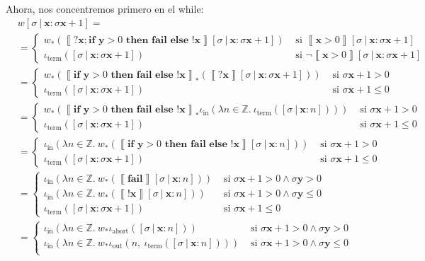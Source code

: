 \documentclass{article}
\newcommand{\sem}[1]{\left\llbracket #1\right\rrbracket}
\newcommand{\Z}{\mathbb{Z}}
\newcommand{\x}{\textbf{x}}
\newcommand{\y}{\textbf{y}}
\newcommand{\cif}[3]{\textbf{if }#1\textbf{ then }#2\textbf{ else }#3}
\newcommand{\cfail}{\textbf{fail}}
\newcommand{\iterm}[1]{\iota_\text{term}\left(#1\right)}
\newcommand{\iabort}[1]{\iota_\text{abort}\left(#1\right)}
\newcommand{\iout}[2]{\iota_\text{out}\left(#1,\ #2\right)}
\newcommand{\iin}[2]{\iota_\text{in}\left(\lambda #1 \in \Z .\ #2\right)}
\begin{document}
Ahora, nos concentremos primero en el while:
\begin{equation}
  \tag*{(8.2)}
  \begin{aligned}
    & w[\sigma\ |\ \x : \sigma\x+1] = \\ 
    &= \begin{cases}
        w_* (\sem{?\x; \cif{\y>0}{\cfail}{!\x}}[\sigma\ |\ \x : \sigma\x+1]) &\text{ si }\sem{\x>0}[\sigma\ |\ \x : \sigma\x+1] \\ 
        \iterm{[\sigma\ |\ \x : \sigma\x+1]} &\text{ si }\neg\sem{\x>0}[\sigma\ |\ \x : \sigma\x+1]
      \end{cases} \\ 
    &= \begin{cases}
      w_* (\sem{\cif{\y>0}{\cfail}{!\x}}_* (\sem{?\x}[\sigma\ |\ \x : \sigma\x+1])) &\text{ si }\sigma\x+1 > 0 \\ 
      \iterm{[\sigma\ |\ \x : \sigma\x+1]} &\text{ si }\sigma\x+1 \leq 0
    \end{cases} \\ 
    &= \begin{cases}
      w_* (\sem{\cif{\y>0}{\cfail}{!\x}}_* \iin{n}{\iterm{[\sigma\ |\ \x : n]}}) &\text{ si }\sigma\x+1 > 0 \\ 
      \iterm{[\sigma\ |\ \x : \sigma\x+1]} &\text{ si }\sigma\x+1 \leq 0
    \end{cases} \\ 
    &= \begin{cases}
      \iin{n}{w_* (\sem{\cif{\y>0}{\cfail}{!\x}} [\sigma\ |\ \x : n])} &\text{ si }\sigma\x+1 > 0 \\ 
      \iterm{[\sigma\ |\ \x : \sigma\x+1]} &\text{ si }\sigma\x+1 \leq 0
    \end{cases} \\ 
    &= \begin{cases}
      \iin{n}{w_* (\sem{\cfail} [\sigma\ |\ \x : n])} &\text{ si }\sigma\x+1 > 0 \land \sigma\y > 0 \\ 
      \iin{n}{w_* (\sem{!\x} [\sigma\ |\ \x : n])} &\text{ si }\sigma\x+1 > 0 \land \sigma\y \leq 0 \\ 
      \iterm{[\sigma\ |\ \x : \sigma\x+1]} &\text{ si }\sigma\x+1 \leq 0
    \end{cases} \\ 
    &= \begin{cases}
      \iin{n}{w_* \iabort{[\sigma\ |\ \x : n]}} &\text{ si }\sigma\x+1 > 0 \land \sigma\y > 0 \\ 
      \iin{n}{w_* \iout{n}{\iterm{[\sigma\ |\ \x : n]}}} &\text{ si }\sigma\x+1 > 0 \land \sigma\y \leq 0 \\ 

\end{cases}
\end{aligned}
\end{equation}
\end{document}
